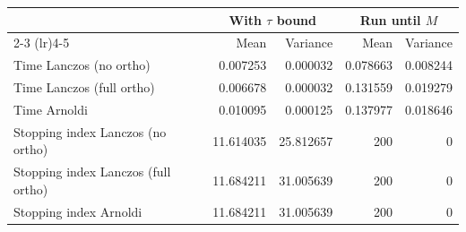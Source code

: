 \begin{tabular}{lrrrr}
\toprule
                                    & \multicolumn{2}{c}{With $ \tau $ bound} & \multicolumn{2}{c}{Run until $ M $} \\
\cmidrule(lr){2-3} \cmidrule(lr){4-5}
                                    & Mean & Variance & Mean & Variance \\
\midrule
Time Lanczos (no ortho)             & 0.007253 & 0.000032 & 0.078663 & 0.008244 \\
Time Lanczos (full ortho)           & 0.006678 & 0.000032 & 0.131559 & 0.019279 \\
Time Arnoldi                        & 0.010095 & 0.000125 & 0.137977 & 0.018646 \\
Stopping index Lanczos (no ortho)   & 11.614035 & 25.812657 & 200 & 0 \\
Stopping index Lanczos (full ortho) & 11.684211 & 31.005639 & 200 & 0 \\
Stopping index Arnoldi              & 11.684211 & 31.005639 & 200 & 0 \\
\bottomrule
\end{tabular}

